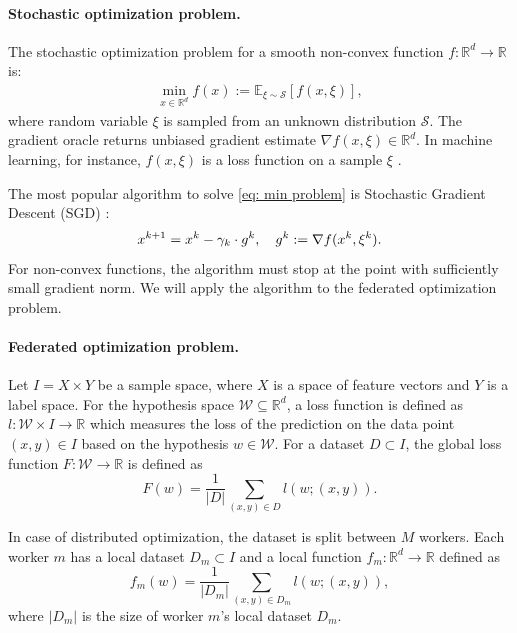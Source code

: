 \documentclass[12pt]{article}
\newcommand{\EE}{\mathbb{E}}
\newcommand{\R}{\mathbb{R}}
\newcommand{\algname}[1]{{\sf  #1}\xspace}
\begin{document}
\paragraph{Stochastic optimization problem.} The stochastic optimization problem for a smooth non-convex function $f:\R^d \to \R$ is:
\begin{eqnarray}
    \min\limits_{x \in \R^d} f(x) := \EE_{\xi \sim \mathcal{S}} [f(x, \xi)],\label{eq: min problem}
\end{eqnarray}
where random variable $\xi$ is sampled from an unknown distribution $\mathcal{S}.$ The gradient oracle returns unbiased gradient estimate $\nabla f (x, \xi) \in \R^d$. In machine learning, for instance, $f(x, \xi)$ is a loss function on a sample $\xi$ \parencite{ShalevShwartz2014}.

The most popular algorithm to solve \eqref{eq: min problem} is Stochastic Gradient Descent (\algname{SGD}) 
 \parencite{Robbins1951}:
\begin{equation}
    x^{k+1} = x^k - \gamma_k \cdot  g^k, \quad g^k := \nabla f (x^k, \xi^k). \notag \label{eq: sgd intro}
\end{equation}
For non-convex functions, the algorithm must stop at the point with sufficiently small gradient norm.
We will apply the algorithm to the federated optimization problem.

\paragraph{Federated optimization problem.}
Let $I = X \times Y$ be a sample space, where $X$ is a space of feature vectors and $Y$ is a label space. For the hypothesis space $\mathcal{W} \subseteq \R^d$, a loss function is defined as $l: \mathcal{W}\times I \rightarrow \R$ which measures the loss of the prediction on the data point $(x,y) \in I$ based on the hypothesis $w \in \mathcal{W}$. For a dataset $D \subset I$, the global loss function $F:\mathcal{W}\to \R$ is defined as
\begin{equation}
F(w) = \frac{1}{|D|}\sum_{(x,y)\in D}l(w;(x,y)).
\end{equation}

In case of distributed optimization, the dataset is split between $M$ workers. Each worker $m$ has a local dataset $D_m \subset I$ and a local function $f_m:\R^d \to \R$ defined as
\begin{equation}
f_m(w)=\frac{1}{|D_m|}\sum_{(x,y)\in D_m}l(w;(x,y)),
\end{equation}
where $|D_m|$ is the size of worker $m$'s local dataset $D_m$.
\end{document}
